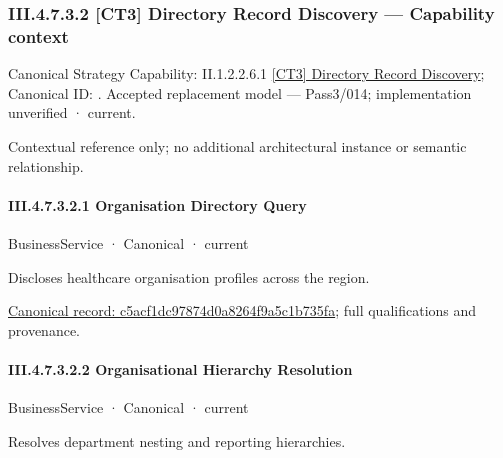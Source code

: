 \subsubsection*{III.4.7.3.2 [CT3] Directory Record Discovery — Capability context}
\label{navigation:III.4.7.3.2}

{\small Canonical Strategy Capability: II.1.2.2.6.1 \hyperref[element:2bebb37d407a4816aed79e9a13e324e9]{[CT3] Directory Record Discovery}; Canonical ID: \texttt{}. Accepted replacement model — Pass3/014; implementation unverified · current.}\par
Contextual reference only; no additional architectural instance or semantic relationship.\par
\paragraph*{III.4.7.3.2.1 Organisation Directory Query}
\label{navigation:III.4.7.3.2.1}

\label{element:c5acf1dc97874d0a8264f9a5c1b735fa}
{\small BusinessService · Canonical · current}\par

Discloses healthcare organisation profiles across the region.


{\footnotesize \href{../../../../../../../../continuum/business/business-service/c5acf1dc97874d0a8264f9a5c1b735fa.md}{Canonical record: c5acf1dc97874d0a8264f9a5c1b735fa}; full qualifications and provenance.}\par
\paragraph*{III.4.7.3.2.2 Organisational Hierarchy Resolution}
\label{navigation:III.4.7.3.2.2}

\label{element:c9187704dd7f49f69f9e674c16e9181b}
{\small BusinessService · Canonical · current}\par

Resolves department nesting and reporting hierarchies.


